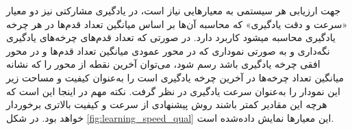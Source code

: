 جهت ارزیابی هر سیستمی به معیارهایی نیاز است، در یادگیری مشارکتی نیز دو معیار «سرعت و دقت یادگیری» که محاسبه آن‌ها بر اساس میانگین تعداد قدم‌ها در هر چرخه یادگیری محاسبه میشود کاربرد دارد. در صورتی که تعداد قدم‌های چرخه‌های یادگیری نگه‌داری و به صورتی نموداری که در محور عمودی میانگین تعداد قدم‌ها و در محور افقی چرخه یادگیری باشد رسم شود، می‌توان آخرین نقطه از محور را که نشانه میانگین تعداد چرخه‌ها در آخرین چرخه یادگیری است را به‌عنوان کیفیت و مساحت زیر این نمودار را به‌عنوان سرعت یادگیری در نظر گرفت. نکته مهم در اینجا این است که هرچه این مقادیر کمتر باشند روش پیشنهادی از سرعت و کیفیت بالاتری برخوردار خواهد بود. در شکل \ref{fig:learning_speed_qual} این معیارها نمایش داده‌شده است.

